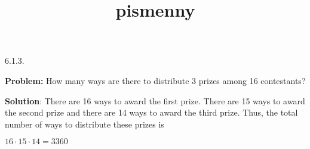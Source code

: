 \documentclass{article}
\title{pismenny}
\begin{document}
\begin{center}
6.1.3. 
\end{center}


\textbf{Problem:} 
How many ways are there to distribute 3 prizes among 16 contestants?


\textbf{Solution}: There are 16 ways to award the first prize. There are 15 ways to award the second prize and there are 14 ways to award the third prize. Thus, the total number of ways to distribute these prizes is 

\begin{center}
    $
        16 \cdot 15 \cdot 14=3360 
    $ 
\end{center}
\end{document}
